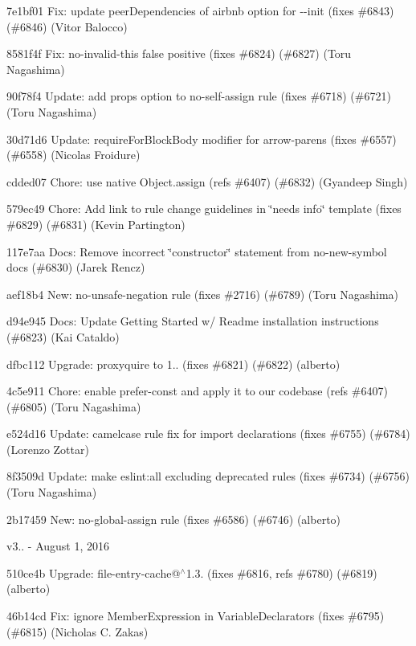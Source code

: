 \begin{DoxyItemize}
\item 7e1bf01 Fix\+: update peer\+Dependencies of airbnb option for {\ttfamily -\/-\/init} (fixes \#6843) (\#6846) (Vitor Balocco)
\item 8581f4f Fix\+: {\ttfamily no-\/invalid-\/this} false positive (fixes \#6824) (\#6827) (Toru Nagashima)
\item 90f78f4 Update\+: add {\ttfamily props} option to {\ttfamily no-\/self-\/assign} rule (fixes \#6718) (\#6721) (Toru Nagashima)
\item 30d71d6 Update\+: \textquotesingle{}require\+For\+Block\+Body\textquotesingle{} modifier for \textquotesingle{}arrow-\/parens\textquotesingle{} (fixes \#6557) (\#6558) (Nicolas Froidure)
\item cdded07 Chore\+: use native {\ttfamily Object.\+assign} (refs \#6407) (\#6832) (Gyandeep Singh)
\item 579ec49 Chore\+: Add link to rule change guidelines in \char`\"{}needs info\char`\"{} template (fixes \#6829) (\#6831) (Kevin Partington)
\item 117e7aa Docs\+: Remove incorrect \char`\"{}constructor\char`\"{} statement from {\ttfamily no-\/new-\/symbol} docs (\#6830) (Jarek Rencz)
\item aef18b4 New\+: {\ttfamily no-\/unsafe-\/negation} rule (fixes \#2716) (\#6789) (Toru Nagashima)
\item d94e945 Docs\+: Update Getting Started w/ Readme installation instructions (\#6823) (Kai Cataldo)
\item dfbc112 Upgrade\+: proxyquire to 1.. (fixes \#6821) (\#6822) (alberto)
\item 4c5e911 Chore\+: enable {\ttfamily prefer-\/const} and apply it to our codebase (refs \#6407) (\#6805) (Toru Nagashima)
\item e524d16 Update\+: camelcase rule fix for import declarations (fixes \#6755) (\#6784) (Lorenzo Zottar)
\item 8f3509d Update\+: make {\ttfamily eslint\+:all} excluding deprecated rules (fixes \#6734) (\#6756) (Toru Nagashima)
\item 2b17459 New\+: {\ttfamily no-\/global-\/assign} rule (fixes \#6586) (\#6746) (alberto)
\end{DoxyItemize}

v3.. -\/ August 1, 2016


\begin{DoxyItemize}
\item 510ce4b Upgrade\+: file-\/entry-\/cache@$^\wedge$1.3. (fixes \#6816, refs \#6780) (\#6819) (alberto)
\item 46b14cd Fix\+: ignore Member\+Expression in Variable\+Declarators (fixes \#6795) (\#6815) (Nicholas C. Zakas)
\end{DoxyItemize}

